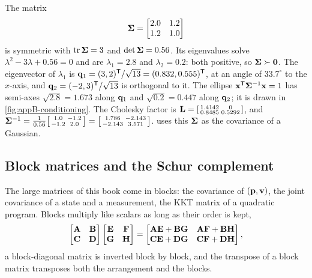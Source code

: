 \begin{example}
\label{ex:appB-eigen}
The matrix
\begin{equation}
  \mathbf{\Sigma} = \begin{bmatrix} 2.0 & 1.2\\ 1.2 & 1.0 \end{bmatrix}
  \label{eq:appB-sigma}
\end{equation}
is symmetric with $\operatorname{tr}\mathbf{\Sigma} = 3$ and $\det\mathbf{\Sigma} = 0.56$. Its
eigenvalues solve $\lambda^2 - 3\lambda + 0.56 = 0$ and are $\lambda_1 = 2.8$
and $\lambda_2 = 0.2$: both positive, so $\mathbf{\Sigma} \succ \mathbf{0}$. The
eigenvector of $\lambda_1$ is $\mathbf{q}_1 = (3, 2)^{\mathsf{T}}/\sqrt{13} = (0.832,
0.555)^{\mathsf{T}}$, at an angle of $33.7^\circ$ to the $x$-axis, and $\mathbf{q}_2 =
(-2, 3)^{\mathsf{T}}/\sqrt{13}$ is orthogonal to it. The ellipse
$\mathbf{x}^{\mathsf{T}}\mathbf{\Sigma}^{-1}\mathbf{x} = 1$ has semi-axes $\sqrt{2.8} = 1.673$
along $\mathbf{q}_1$ and $\sqrt{0.2} = 0.447$ along $\mathbf{q}_2$; it is drawn in
\cref{fig:appB-conditioning}. The Cholesky factor is
$\mathbf{L} = \begin{bsmallmatrix} 1.4142 & 0\\ 0.8485 & 0.5292\end{bsmallmatrix}$,
and $\mathbf{\Sigma}^{-1} = \frac{1}{0.56}\begin{bsmallmatrix} 1.0 & -1.2\\ -1.2 &
2.0\end{bsmallmatrix} = \begin{bsmallmatrix} 1.786 & -2.143\\ -2.143 &
3.571\end{bsmallmatrix}$.  uses this
$\mathbf{\Sigma}$ as the covariance of a Gaussian.
\end{example}

\subsection{Block matrices and the Schur complement}
\label{sec:appB-schur}

The large matrices of this book come in blocks: the covariance of $(\mathbf{p},
\mathbf{v})$, the joint covariance of a state and a measurement, the KKT matrix of a
quadratic program. Blocks multiply like scalars as long as their order is kept,
\begin{equation}
  \begin{bmatrix}\mathbf{A} & \mathbf{B}\\ \mathbf{C} & \mathbf{D}\end{bmatrix}
  \begin{bmatrix}\mathbf{E} & \mathbf{F}\\ \mathbf{G} & \mathbf{H}\end{bmatrix} =
  \begin{bmatrix}\mathbf{A}\mathbf{E} + \mathbf{B}\mathbf{G} & \mathbf{A}\mathbf{F} + \mathbf{B}\mathbf{H}\\
                 \mathbf{C}\mathbf{E} + \mathbf{D}\mathbf{G} & \mathbf{C}\mathbf{F} + \mathbf{D}\mathbf{H}\end{bmatrix},
  \label{eq:appB-block-product}
\end{equation}
a block-diagonal matrix is inverted block by block, and the transpose of a
block matrix transposes both the arrangement and the blocks.

